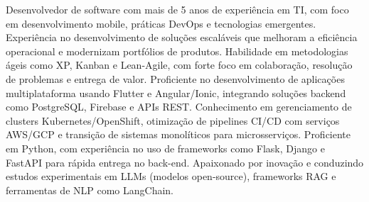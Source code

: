 

\begin{cvparagraph}

Desenvolvedor de software com mais de 5 anos de experiência em TI, com foco em desenvolvimento mobile, práticas DevOps e tecnologias emergentes. Experiência no desenvolvimento de soluções escaláveis que melhoram a eficiência operacional e modernizam portfólios de produtos. Habilidade em metodologias ágeis como XP, Kanban e Lean-Agile, com forte foco em colaboração, resolução de problemas e entrega de valor. Proficiente no desenvolvimento de aplicações multiplataforma usando Flutter e Angular/Ionic, integrando soluções backend como PostgreSQL, Firebase e APIs REST. Conhecimento em gerenciamento de clusters Kubernetes/OpenShift, otimização de pipelines CI/CD com serviços AWS/GCP e transição de sistemas monolíticos para microsserviços. Proficiente em Python, com experiência no uso de frameworks como Flask, Django e FastAPI para rápida entrega no back-end. Apaixonado por inovação e conduzindo estudos experimentais em LLMs (modelos open-source), frameworks RAG e ferramentas de NLP como LangChain.
\end{cvparagraph}